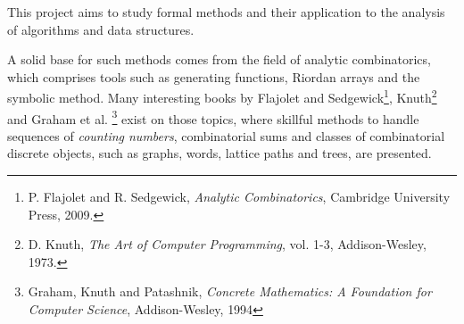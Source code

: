 
\noindent This project aims to study formal methods and their application to
the analysis of algorithms and data structures.

A solid base for such
methods comes from the field of analytic combinatorics, which comprises tools
such as generating functions, Riordan arrays and the symbolic method. Many
interesting books by Flajolet and Sedgewick\footnote{P. Flajolet and R.
Sedgewick, \emph{Analytic Combinatorics}, Cambridge University Press, 2009.},
Knuth\footnote{D. Knuth, \emph{The Art of Computer Programming}, vol.  1-3,
Addison-Wesley, 1973.} and Graham et al. \footnote{Graham, Knuth and Patashnik,
\emph{Concrete Mathematics: A Foundation for Computer Science}, Addison-Wesley,
1994} exist on those topics, where skillful methods to handle sequences of
\emph{counting numbers}, combinatorial sums and classes of combinatorial
discrete objects, such as graphs, words, lattice paths and trees, are
presented. 

